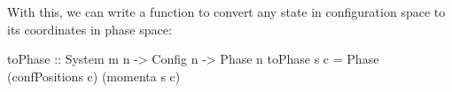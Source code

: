 \documentclass[]{article}
\newenvironment{Shaded}{}{}
\newcommand{\DataTypeTok}[1]{\textcolor[rgb]{0.56,0.13,0.00}{#1}}
\newcommand{\OtherTok}[1]{\textcolor[rgb]{0.00,0.44,0.13}{#1}}
\newcommand{\FunctionTok}[1]{\textcolor[rgb]{0.02,0.16,0.49}{#1}}
\newcommand{\NormalTok}[1]{#1}
\begin{document}
With this, we can write a function to convert any state in configuration space
to its coordinates in phase space:

\begin{Shaded}
\begin{Highlighting}[]
\OtherTok{toPhase ::} \DataTypeTok{System}\NormalTok{ m n }\OtherTok{->} \DataTypeTok{Config}\NormalTok{ n }\OtherTok{->} \DataTypeTok{Phase}\NormalTok{ n}
\NormalTok{toPhase s c }\FunctionTok{=} \DataTypeTok{Phase}\NormalTok{ (confPositions c) (momenta s c)}
\end{Highlighting}
\end{Shaded}
\end{document}
